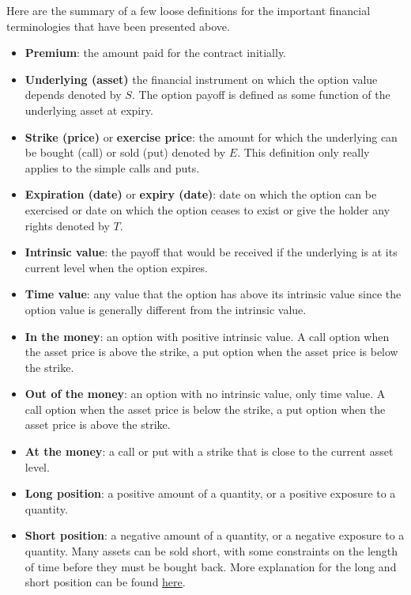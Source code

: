 Here are the summary of a few loose definitions for the important financial terminologies that have been presented above. 
\begin{itemize}
    \setlength\itemsep{0em}
    \item \textbf{Premium}: the amount paid for the contract initially.
    \item \textbf{Underlying (asset)} the financial instrument on which the option value depends denoted by $S$. The option payoff is defined as some function of the underlying asset at expiry.
    \item \textbf{Strike (price)} or \textbf{exercise price}: the amount for which the underlying can be bought (call) or sold (put) denoted by $E$. This definition only really applies to the simple calls and puts.
    \item \textbf{Expiration (date)} or \textbf{expiry (date)}: date on which the option can be exercised or date on which the option ceases to exist or give the holder any rights denoted by $T$.
    \item \textbf{Intrinsic value}: the payoff that would be received if the underlying is at its current level when the option expires.
    \item \textbf{Time value}: any value that the option has above its intrinsic value since the option value is generally different from the intrinsic value.
    \item \textbf{In the money}: an option with positive intrinsic value. A call option when the asset price is above the strike, a put option when the asset price is below the strike.
    \item \textbf{Out of the money}: an option with no intrinsic value, only time value. A call option when the asset price is below the strike, a put option when the asset price is above the strike.
    \item \textbf{At the money}: a call or put with a strike that is close to the current asset level.
    \item \textbf{Long position}: a positive amount of a quantity, or a positive exposure to a quantity.
    \item \textbf{Short position}: a negative amount of a quantity, or a negative exposure to a quantity. Many assets can be sold short, with some constraints on the length of time before they must be bought back. More explanation for the long and short position can be found \href{http://positron-investments.com/en/technical-analysis-basics/long-versus-short-selling/}{here}.
\end{itemize}


